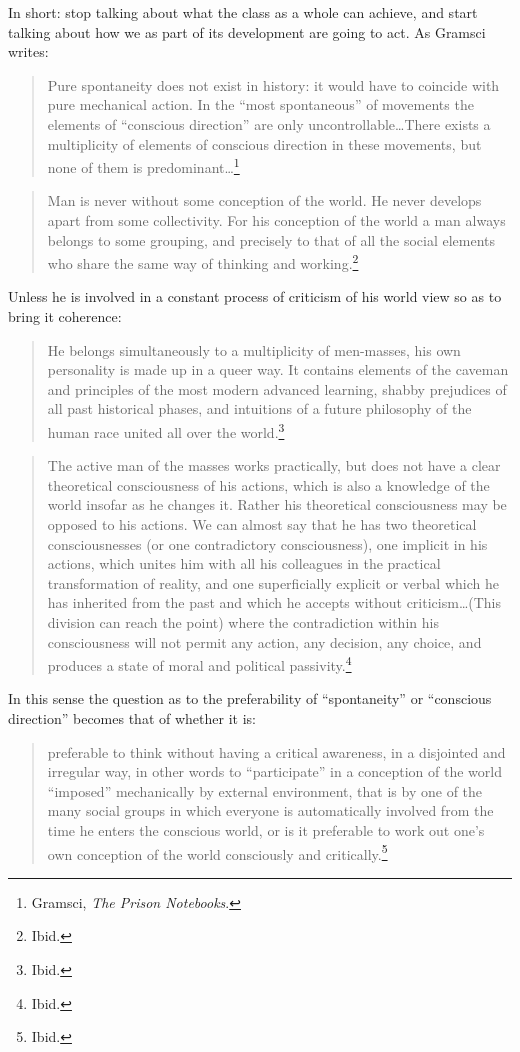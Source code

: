 In short: stop talking about what the class as a whole can achieve, and start talking about how we as part of its development are going to act. As Gramsci writes:

\blockquote{Pure spontaneity does not exist in history: it would have to coincide with pure mechanical action. In the ``most spontaneous'' of movements the elements of ``conscious direction'' are only uncontrollable\ldots There exists a multiplicity of elements of conscious direction in these movements, but none of them is predominant\ldots\footnote{Gramsci, \emph{The Prison Notebooks}.}}

\blockquote{Man is never without some conception of the world. He never develops apart from some collectivity. For his conception of the world a man always belongs to some grouping, and precisely to that of all the social elements who share the same way of thinking and working.\footnote{Ibid.}}

Unless he is involved in a constant process of criticism of his world view so as to bring it coherence:

\blockquote{He belongs simultaneously to a multiplicity of men-masses, his own personality is made up in a queer way. It contains elements of the caveman and principles of the most modern advanced learning, shabby prejudices of all past historical phases, and intuitions of a future philosophy of the human race united all over the world.\footnote{Ibid.}}

\blockquote{The active man of the masses works practically, but does not have a clear theoretical consciousness of his actions, which is also a knowledge of the world insofar as he changes it. Rather his theoretical consciousness may be opposed to his actions. We can almost say that he has two theoretical consciousnesses (or one contradictory consciousness), one implicit in his actions, which unites him with all his colleagues in the practical transformation of reality, and one superficially explicit or verbal which he has inherited from the past and which he accepts without criticism\ldots (This division can reach the point) where the contradiction within his consciousness will not permit any action, any decision, any choice, and produces a state of moral and political passivity.\footnote{Ibid.}}

In this sense the question as to the preferability of ``spontaneity'' or ``conscious direction'' becomes that of whether it is:

\blockquote{preferable to think without having a critical awareness, in a disjointed and irregular way, in other words to ``participate'' in a conception of the world ``imposed'' mechanically by external environment, that is by one of the many social groups in which everyone is automatically involved from the time he enters the conscious world, or is it preferable to work out one's own conception of the world consciously and critically.\footnote{Ibid.}}

